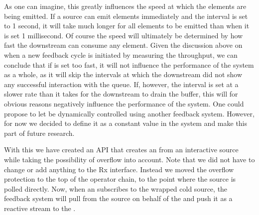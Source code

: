 As one can imagine, this greatly influences the speed at which the elements are being emitted. If a source can emit elements immediately and the interval is set to 1 second, it will take much longer for all elements to be emitted than when it is set 1 millisecond. Of course the speed will ultimately be determined by how fast the downstream can consume any element. Given the discussion above on when a new feedback cycle is initiated by measuring the throughput, we can conclude that if  is set too fast, it will not influence the performance of the system as a whole, as it will skip the intervals at which the downstream did not show any successful interaction with the queue. If, however, the interval is set at a slower rate than it takes for the downstream to drain the buffer, this will for obvious reasons negatively influence the performance of the system. One could propose to let  be dynamically controlled using another feedback system. However, for now we decided to define it as a constant value in the system and make this part of future research.

With this we have created an API that creates an \obs from an interactive source while taking the possibility of overflow into account. Note that we did not have to change or add anything to the Rx interface. Instead we moved the overflow protection to the top of the operator chain, to the point where the source is polled directly. Now, when an \obv subscribes to the wrapped cold source, the feedback system will pull from the source on behalf of the \obv and push it as a reactive stream to the \obv.
